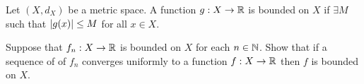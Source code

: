\begin{problem}
  Let $(X, d_X)$ be a metric space.
  A function $g : X \to \mathbb{R}$ is bounded on $X$
  if $\exists M$ such that $\lvert g(x)\rvert \leq M$ for all $x \in X$.

  \step
  Suppose that $f_n : X \to \mathbb{R}$ is bounded on $X$ for each $n \in \mathbb{N}$.
  Show that if a sequence of of $f_n$ converges uniformly
  to a function $f : X \to \mathbb{R}$ then $f$ is bounded on $X$.
\end{problem}

\begin{answer}

\end{answer}
